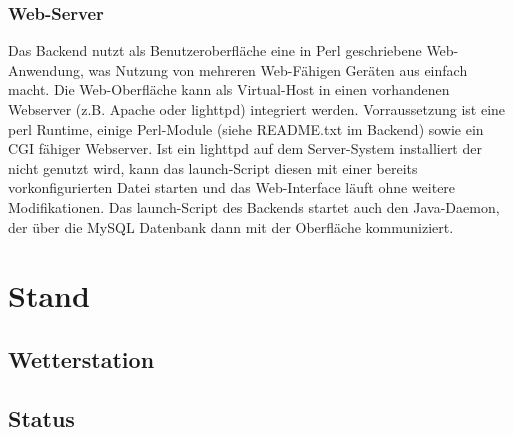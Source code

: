 \documentclass[12pt,a4paper]{article}
\begin{document}
\subsubsection{Web-Server}
Das Backend nutzt als Benutzeroberfläche eine in Perl geschriebene Web-Anwendung, was Nutzung von mehreren Web-Fähigen Geräten aus einfach macht. Die Web-Oberfläche kann als Virtual-Host in einen vorhandenen Webserver (z.B. Apache oder lighttpd) integriert werden. Vorraussetzung ist eine perl Runtime, einige Perl-Module (siehe README.txt im Backend) sowie ein CGI fähiger Webserver. Ist ein lighttpd auf dem Server-System installiert der nicht genutzt wird, kann das launch-Script diesen mit einer bereits vorkonfigurierten Datei starten und das Web-Interface läuft ohne weitere Modifikationen.
Das launch-Script des Backends startet auch den Java-Daemon, der über die MySQL Datenbank dann mit der Oberfläche kommuniziert.
\section{Stand}
\subsection{Wetterstation}
\subsection{Status}
\end{document}

